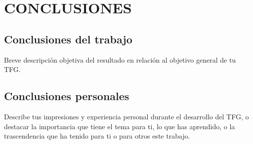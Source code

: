 \chapter{CONCLUSIONES}
\section{Conclusiones del trabajo}
Breve descripci\'on objetiva del resultado en relaci\'on al objetivo general de tu TFG.

\section{Conclusiones personales}
Describe tus impresiones y experiencia personal durante el desarrollo del TFG, o destacar la importancia que tiene el tema para ti, lo que has aprendido, o la trascendencia que ha tenido para ti o para otros este trabajo.

